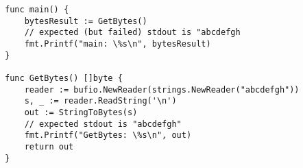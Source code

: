 \begin{lstlisting}[language=Golang, label=lst:escape-analysis-flaw, caption=Escape analysis flaw proof of concept]
func main() {
    bytesResult := GetBytes()
    // expected (but failed) stdout is "abcdefgh
    fmt.Printf("main: \%s\n", bytesResult)
}

func GetBytes() []byte {
    reader := bufio.NewReader(strings.NewReader("abcdefgh"))
    s, _ := reader.ReadString('\n')
    out := StringToBytes(s)
    // expected stdout is "abcdefgh"
    fmt.Printf("GetBytes: \%s\n", out)
    return out
}
\end{lstlisting}